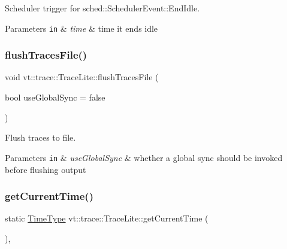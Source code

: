Scheduler trigger for {\ttfamily sched\+::\+Scheduler\+Event\+::\+End\+Idle}. 


\begin{DoxyParams}[1]{Parameters}
\mbox{\tt in}  & {\em time} & time it ends idle \\
\hline
\end{DoxyParams}
\mbox{\label{structvt_1_1trace_1_1_trace_lite_a31513ed82d3b3c74369fde81491eb3a2}} 
\subsubsection{\texorpdfstring{flush\+Traces\+File()}{flushTracesFile()}}
{\footnotesize\ttfamily void vt\+::trace\+::\+Trace\+Lite\+::flush\+Traces\+File (\begin{DoxyParamCaption}\item[{bool}]{use\+Global\+Sync = {\ttfamily false} }\end{DoxyParamCaption})}



Flush traces to file. 


\begin{DoxyParams}[1]{Parameters}
\mbox{\tt in}  & {\em use\+Global\+Sync} & whether a global sync should be invoked before flushing output \\
\hline
\end{DoxyParams}
\mbox{\label{structvt_1_1trace_1_1_trace_lite_a5ddfc40d8206946d33630d4b81b6126c}} 
\subsubsection{\texorpdfstring{get\+Current\+Time()}{getCurrentTime()}}
{\footnotesize\ttfamily static \hyperlink{namespacevt_a2b9f28078dc309ad0706b69ded743e69}{Time\+Type} vt\+::trace\+::\+Trace\+Lite\+::get\+Current\+Time (\begin{DoxyParamCaption}{ }\end{DoxyParamCaption})\hspace{0.3cm}{\ttfamily [inline]}, {\ttfamily [static]}}



